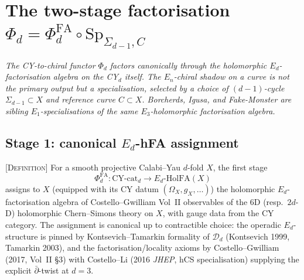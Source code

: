 
\providecommand{\ClaimStatusTheorem}{\textsc{[Theorem]}}
\providecommand{\ClaimStatusConjectured}{\textsc{[Conjectured]}}
\providecommand{\ClaimStatusCorrected}{\textsc{[Corrected]}}
\providecommand{\ClaimStatusDefinition}{\textsc{[Definition]}}
\providecommand{\kBKM}{\kappa_{\mathrm{BKM}}}
\providecommand{\kch}{\kappa_{\mathrm{ch}}}
\providecommand{\kcat}{\kappa_{\mathrm{cat}}}
\providecommand{\kfib}{\kappa_{\mathrm{fiber}}}
\providecommand{\CYcat}{\mathrm{CY}\text{-cat}}
\providecommand{\ChirAlg}{\mathrm{ChirAlg}}
\providecommand{\HolFA}{\mathrm{HolFA}}
\providecommand{\Sp}{\mathrm{Sp}}
\providecommand{\ZZ}{\mathbb{Z}}
\providecommand{\hCS}{\mathrm{hCS}}
\providecommand{\Obs}{\mathrm{Obs}}
\providecommand{\CE}{\mathrm{CE}}
\providecommand{\cE}{\mathcal{E}}
\providecommand{\cO}{\mathcal{O}}
\providecommand{\bH}{\mathbf{H}}

\section{The two-stage factorisation $\Phi_d = \Phi^{\mathrm{FA}}_d \circ \Sp_{\Sigma_{d-1},C}$}
\label{wn:sec:two-stage-Phi-factorisation}

\emph{The CY-to-chiral functor $\Phi_d$ factors canonically through the holomorphic
$E_d$-factorisation algebra on the CY$_d$ itself. The $E_n$-chiral shadow on a
curve is not the primary output but a specialisation, selected by a choice of
$(d{-}1)$-cycle $\Sigma_{d-1} \subset X$ and reference curve $C \subset X$.
Borcherds, Igusa, and Fake-Monster are sibling $E_1$-specialisations of the same
$E_3$-holomorphic factorisation algebra.}

\subsection{Stage 1: canonical $E_d$-hFA assignment}
\label{wn:subsec:stage-1-Ed-hFA}

\begin{definition}\ClaimStatusDefinition
\label{wn:def:stage-1-Ed-hFA}
For a smooth projective Calabi--Yau $d$-fold $X$, the first stage
$$
\Phi^{\mathrm{FA}}_d: \CYcat_d \longrightarrow E_d\text{-}\HolFA(X)
$$
assigns to $X$ (equipped with its CY datum $(\Omega_X, g_X, \ldots)$) the
holomorphic $E_d$-factorisation algebra of Costello--Gwilliam Vol~II
observables of the 6D (resp.\ $2d$-D) holomorphic Chern--Simons theory on $X$,
with gauge data from the CY category. The assignment is canonical up to
contractible choice: the operadic $E_d$-structure is pinned by Kontsevich--Tamarkin
formality of $\mathcal{D}_d$ (Kontsevich 1999, Tamarkin 2003), and the
factorisation/locality axioms by Costello--Gwilliam (2017, Vol~II \S 3)
with Costello--Li (2016 \emph{JHEP}, hCS specialisation) supplying the
explicit $\bar\partial$-twist at $d=3$.
\end{definition}


